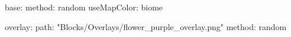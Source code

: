 base:
  method: random
  useMapColor: biome
  
overlay:
  path: "Blocks/Overlays/flower_purple_overlay.png"
  method: random